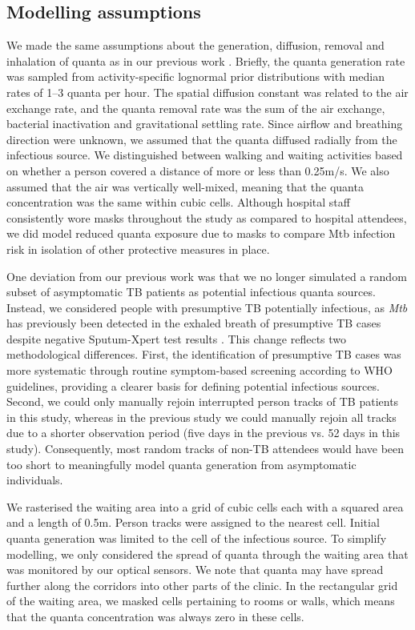 \documentclass[11pt]{article}
\begin{document}
\subsection{Modelling assumptions}\label{modelling-assumptions}

We made the same assumptions about the generation, diffusion, removal and inhalation of quanta as in our previous work \cite{banholzer2025PLOSComputBiol}. Briefly, the quanta generation rate was sampled from activity-specific lognormal prior distributions with median rates of 1--3 quanta per hour. The spatial diffusion constant was related to the air exchange rate, and the quanta removal rate was the sum of the air exchange, bacterial inactivation and gravitational settling rate. Since airflow and breathing direction were unknown, we assumed that the quanta diffused radially from the infectious source. We distinguished between walking and waiting activities based on whether a person covered a distance of more or less than 0.25m/s. We also assumed that the air was vertically well-mixed, meaning that the quanta concentration was the same within cubic cells. Although hospital staff consistently wore masks throughout the study as compared to hospital attendees, we did model reduced quanta exposure due to masks to compare Mtb infection risk in isolation of other protective measures in place.

One deviation from our previous work was that we no longer simulated a random subset of asymptomatic TB patients as potential infectious quanta sources. Instead, we considered people with presumptive TB potentially infectious, as \emph{Mtb} has previously been detected in the exhaled breath of presumptive TB cases despite negative Sputum-Xpert test results \cite{patterson2024ProcNatlAcadSci}. This change reflects two methodological differences. First, the identification of presumptive TB cases was more systematic through routine symptom-based screening according to WHO guidelines, providing a clearer basis for defining potential infectious sources. Second, we could only manually rejoin interrupted person tracks of TB patients in this study, whereas in the previous study we could manually rejoin all tracks due to a shorter observation period (five days in the previous vs. 52 days in this study). Consequently, most random tracks of non-TB attendees would have been too short to meaningfully model quanta generation from asymptomatic individuals.

We rasterised the waiting area into a grid of cubic cells each with a squared area and a length of 0.5m. Person tracks were assigned to the nearest cell. Initial quanta generation was limited to the cell of the infectious source. To simplify modelling, we only considered the spread of quanta through the waiting area that was monitored by our optical sensors. We note that quanta may have spread further along the corridors into other parts of the clinic. In the rectangular grid of the waiting area, we masked cells pertaining to rooms or walls, which means that the quanta concentration was always zero in these cells.
\end{document}
